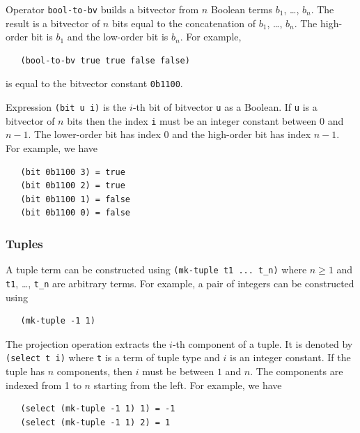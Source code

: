 \documentclass[11pt,twoside,fleqn,openright,titlepage]{cslreport}
\begin{document}
\medskip\noindent
Operator \texttt{bool-to-bv} builds a bitvector from $n$ Boolean
terms $b_1$, \ldots, $b_n$.  The result is a bitvector of $n$ bits
equal to the concatenation of $b_1$, \ldots, $b_n$. The high-order
bit is $b_1$ and the low-order bit is $b_n$. For example,
\begin{small}
\begin{verbatim}
   (bool-to-bv true true false false)
\end{verbatim}
\end{small}
is equal to the bitvector constant \texttt{0b1100}.

\medskip\noindent 
Expression \texttt{(bit u i)} is the $i$-th bit of bitvector
\texttt{u} as a Boolean. If \texttt{u} is a bitvector of $n$ bits then 
the index \texttt{i} must be an integer constant between 0 and $n-1$.
The lower-order bit has index 0 and the high-order bit has index $n-1$.
For example, we have
\begin{small}
\begin{verbatim}
   (bit 0b1100 3) = true
   (bit 0b1100 2) = true
   (bit 0b1100 1) = false
   (bit 0b1100 0) = false
\end{verbatim}
\end{small}


\subsubsection*{Tuples}

A tuple term can be constructed using \texttt{(mk-tuple t1 ... t\_n)}
where $n\geq1$ and \texttt{t1}, \ldots, \texttt{t\_n} are arbitrary
terms. For example, a pair of integers can be constructed using
\begin{small}
\begin{verbatim}
   (mk-tuple -1 1)
\end{verbatim}
\end{small}

\medskip\noindent The projection operation extracts the $i$-th
component of a tuple. It is denoted by \texttt{(select t i)} where
\texttt{t} is a term of tuple type and $i$ is an integer constant.  If
the tuple has $n$ components, then $i$ must be between $1$ and
$n$. The components are indexed from 1 to $n$ starting from the
left. For example, we have
\begin{small}
\begin{verbatim}
   (select (mk-tuple -1 1) 1) = -1
   (select (mk-tuple -1 1) 2) = 1
\end{verbatim}
\end{small}
\end{document}
